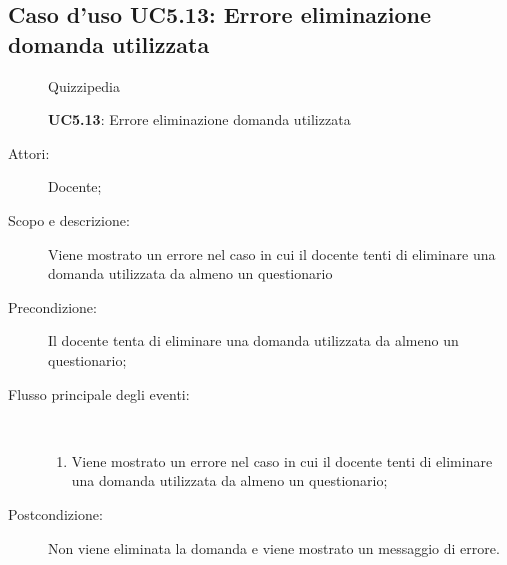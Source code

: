 \subsection{Caso d'uso UC5.13: Errore eliminazione domanda utilizzata}
	\begin{figure}[H]
		\centering
		\begin{resizedtikzpicture}{\textwidth}
		\begin{umlsystem}[x=0, fill=lightgray!20]{Quizzipedia}
		\end{umlsystem}
		\end{resizedtikzpicture}
		\caption{\textbf{UC5.13}: Errore eliminazione domanda utilizzata}
		\label{UC5.13}
	\end{figure}
\begin{description}
\item[Attori:] Docente;
\item[Scopo e descrizione:] Viene mostrato un errore nel caso in cui il docente tenti di eliminare una domanda utilizzata da almeno un questionario
      \item[Precondizione:] Il docente tenta di eliminare una domanda utilizzata da almeno un questionario;

        \item[Flusso principale degli eventi:] \ 
 \begin{enumerate}
          \item Viene mostrato un errore nel caso in cui il docente tenti di eliminare una domanda utilizzata da almeno un questionario;

      \end{enumerate}
    \item[Postcondizione:] Non viene eliminata la domanda e viene mostrato un messaggio di errore.
  \end{description}
\hypertarget{UC6}{}
